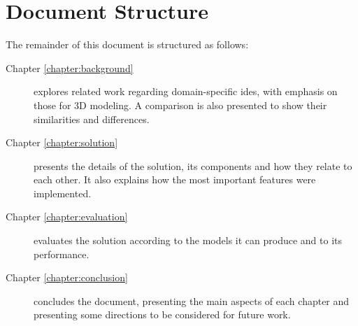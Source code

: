 \section{Document Structure}
The remainder of this document is structured as follows:
\begin{description}
  \item[Chapter \ref{chapter:background}] explores related work regarding domain-specific \glspl{ide}, with emphasis on those for 3D modeling. A comparison is also presented to show their similarities and differences.
  \item[Chapter \ref{chapter:solution}] presents the details of the solution, its components and how they relate to each other. It also explains how the most important features were implemented.
  \item[Chapter \ref{chapter:evaluation}] evaluates the solution according to the models it can produce and to its performance.
  \item[Chapter \ref{chapter:conclusion}] concludes the document, presenting the main aspects of each chapter and presenting some directions to be considered for future work.
\end{description}












%

